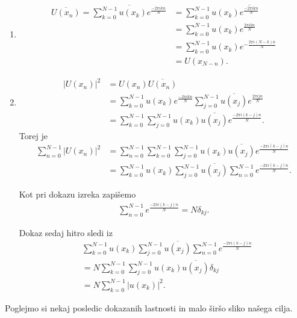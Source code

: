 \documentclass[mat2, tisk]{fmfdelo}
\begin{document}
\begin{dokaz}
\begin{enumerate}
\item[iv)]
\begin{align*}
  \overline{U(x_n)} = \overline{\sum_{k=0}^{N-1} u(x_k) e^{\frac{-2\pi i k n}{N}}} &= 
  \sum_{k=0}^{N-1} u(x_k) \overline{e^{\frac{-2\pi i k n}{N}}}\\
  &= \sum_{k=0}^{N-1} u(x_k) e^{\frac{2\pi i k n}{N}} \\
  &= \sum_{k=0}^{N-1} u(x_k) e^{-\frac{2\pi i (N-k) n}{N}}\\
  &= U(x_{N-n}).
\end{align*}
\item[v)] 
\begin{align*}
|U(x_n)|^2 &= U(x_n) \overline{U(x_n)} \\
&= \sum_{k=0}^{N-1} u(x_k) e^{\frac{-2\pi i k n}{N}} \sum_{j=0}^{N-1} \overline{u(x_j)} e^{\frac{2\pi i j n}{N}}\\
&= \sum_{k=0}^{N-1} \sum_{j=0}^{N-1} u(x_k) \overline{u(x_j)} e^{\frac{-2\pi i (k-j) n}{N}}.
\end{align*}
Torej je
\begin{align*}
\sum_{n=0}^{N-1} |U(x_n)|^2 &= \sum_{n=0}^{N-1} \sum_{k=0}^{N-1} \sum_{j=0}^{N-1} u(x_k) \overline{u(x_j)} e^{\frac{-2\pi i (k-j) n}{N}} \\
&= \sum_{k=0}^{N-1}u(x_k) \sum_{j=0}^{N-1} \overline{u(x_j)} \sum_{n=0}^{N-1} e^{\frac{-2\pi i (k-j) n}{N}}.
\end{align*}

Kot pri dokazu izreka  zapišemo 
\begin{align*}
\sum_{n=0}^{N-1} e^{\frac{-2\pi i (k-j) n}{N}} = N \delta_{kj}.
\end{align*}

Dokaz sedaj hitro sledi iz
\begin{align*}
&\sum_{k=0}^{N-1}u(x_k) \sum_{j=0}^{N-1} \overline{u(x_j)} \sum_{n=0}^{N-1} e^{\frac{-2\pi i (k-j) n}{N}} \\
&= N\sum_{k=0}^{N-1} \sum_{j=0}^{N-1} u(x_k)\overline{u(x_j)} \delta_{kj} \\
&= N\sum_{k=0}^{N-1} |u(x_k)|^2.
\end{align*}
\end{enumerate}
\end{dokaz}

Poglejmo si nekaj posledic dokazanih lastnosti in malo 
širšo sliko našega cilja. \\
\end{document}

